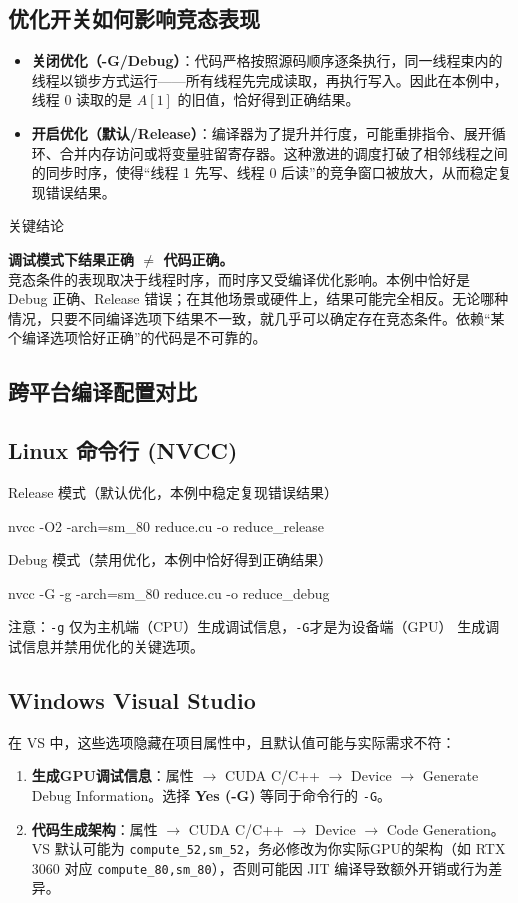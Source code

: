 \subsection{优化开关如何影响竞态表现}
\begin{itemize}
    \item \textbf{关闭优化（-G/Debug）}：代码严格按照源码顺序逐条执行，同一线程束内的线程以锁步方式运行——所有线程先完成读取，再执行写入。因此在本例中，线程 0 读取的是 $A[1]$ 的旧值，恰好得到正确结果。
    \item \textbf{开启优化（默认/Release）}：编译器为了提升并行度，可能重排指令、展开循环、合并内存访问或将变量驻留寄存器。这种激进的调度打破了相邻线程之间的同步时序，使得“线程 1 先写、线程 0 后读”的竞争窗口被放大，从而稳定复现错误结果。
\end{itemize}


关键结论

\textbf{调试模式下结果正确 $\neq$ 代码正确。} \\竞态条件的表现取决于线程时序，而时序又受编译优化影响。本例中恰好是 Debug 正确、Release 错误；在其他场景或硬件上，结果可能完全相反。无论哪种情况，只要不同编译选项下结果不一致，就几乎可以确定存在竞态条件。依赖“某个编译选项恰好正确”的代码是不可靠的。

\subsection{跨平台编译配置对比}

\subsection{Linux 命令行 (NVCC)}

Release 模式（默认优化，本例中稳定复现错误结果）

nvcc -O2 -arch=sm\_80 reduce.cu -o reduce\_release

Debug 模式（禁用优化，本例中恰好得到正确结果）

nvcc -G -g -arch=sm\_80 reduce.cu -o reduce\_debug

注意：\lstinline{-g} 仅为主机端（CPU）生成调试信息，\lstinline{-G}才是为设备端（GPU）
生成调试信息并禁用优化的关键选项。

\subsection{Windows Visual Studio}
在 VS 中，这些选项隐藏在项目属性中，且默认值可能与实际需求不符：
\begin{enumerate}
    \item \textbf{生成GPU调试信息}：属性 $\to$ CUDA C/C++ $\to$ Device $\to$ Generate Debug Information。选择 \textbf{Yes (-G)} 等同于命令行的 \lstinline{-G}。
    \item \textbf{代码生成架构}：属性 $\to$ CUDA C/C++ $\to$ Device $\to$ Code Generation。VS 默认可能为 \lstinline{compute_52,sm_52}，务必修改为你实际GPU的架构（如 RTX 3060 对应 \lstinline{compute_80,sm_80}），否则可能因 JIT 编译导致额外开销或行为差异。
\end{enumerate}


